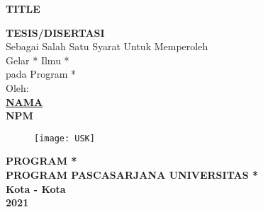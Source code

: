 \begin{spacing}{1}
\begin{center}
{\Large\textbf{TITLE}}\\[1.0cm]
\end{center}
\vspace*{0.8cm} 

\begin{center}

\large{\textbf{TESIS/DISERTASI}}
\\\vspace*{1.8cm}    
\normalsize{Sebagai Salah Satu Syarat Untuk Memperoleh \\
Gelar * Ilmu * \\
pada Program *}\\[1.5cm]
\vspace*{1cm}  
{\large Oleh:}\\
\vspace*{1cm}       
\large{\textbf{\underline{NAMA}}}
\\\large{\textbf{NPM}} 
\end{center}\vspace*{1cm}   

\begin{figure}[h]
\centering
\texttt{[image: USK]} %
\end{figure}
\vspace*{1.5cm}   

\begin{center}
\textbf{PROGRAM *\\
PROGRAM PASCASARJANA UNIVERSITAS *\\
Kota - Kota\\
2021}
\end{center}
\thispagestyle{empty}
	\end{spacing}
